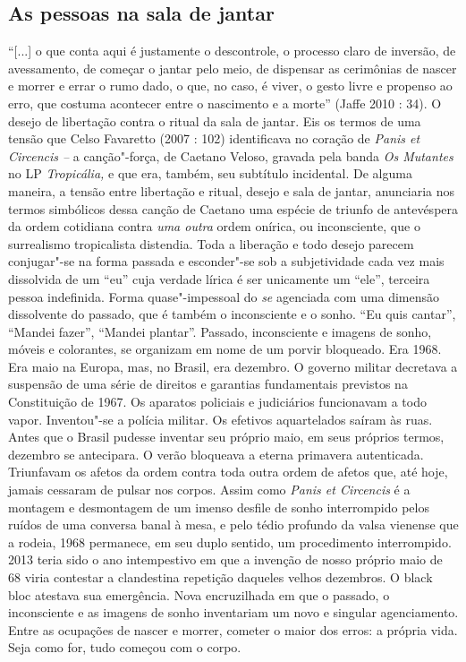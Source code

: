 \subsection{As pessoas na sala de jantar}

``{[}...{]} o que conta aqui é
justamente o descontrole, o processo claro de inversão, de avessamento,
de começar o jantar pelo meio, de dispensar as cerimônias de nascer e
morrer e errar o rumo dado, o que, no caso, é viver, o gesto livre e
propenso ao erro, que costuma acontecer entre o nascimento e a morte''
(Jaffe 2010 : 34). O desejo de libertação contra o ritual da sala de
jantar. Eis os termos de uma tensão que Celso Favaretto (2007 : 102)
identificava no coração de \emph{Panis et Circencis --} a canção"-força,
de Caetano Veloso, gravada pela banda \emph{Os Mutantes }no LP
\emph{Tropicália, }e que era, também, seu subtítulo incidental. De
alguma maneira, a tensão entre libertação e ritual, desejo e sala de
jantar, anunciaria nos termos simbólicos dessa canção de Caetano uma
espécie de triunfo de antevéspera da ordem cotidiana contra \emph{uma
outra} ordem onírica, ou inconsciente, que o surrealismo tropicalista
distendia. Toda a liberação e todo desejo parecem conjugar"-se na forma
passada e esconder"-se sob a subjetividade cada vez mais dissolvida de um
``eu'' cuja verdade lírica é ser unicamente um ``ele'', terceira pessoa
indefinida. Forma quase"-impessoal do \emph{se} agenciada com uma
dimensão dissolvente do passado, que é também o inconsciente e o sonho.
``Eu quis cantar'', ``Mandei fazer'', ``Mandei plantar''. Passado,
inconsciente e imagens de sonho, móveis e colorantes, se organizam em
nome de um porvir bloqueado. Era 1968. Era maio na Europa, mas, no
Brasil, era dezembro. O governo militar decretava a suspensão de uma
série de direitos e garantias fundamentais previstos na Constituição de
1967. Os aparatos policiais e judiciários funcionavam a todo vapor.
Inventou"-se a polícia militar. Os efetivos aquartelados saíram às ruas.
Antes que o Brasil pudesse inventar seu próprio maio, em seus próprios
termos, dezembro se antecipara. O verão bloqueava a eterna primavera
autenticada. Triunfavam os afetos da ordem contra toda outra ordem de
afetos que, até hoje, jamais cessaram de pulsar nos corpos. Assim como
\emph{Panis et Circencis} é a montagem e desmontagem de um imenso
desfile de sonho interrompido pelos ruídos de uma conversa banal à mesa,
e pelo tédio profundo da valsa vienense que a rodeia, 1968 permanece, em
seu duplo sentido, um procedimento interrompido. 2013 teria sido o ano
intempestivo em que a invenção de nosso próprio maio de 68 viria
contestar a clandestina repetição daqueles velhos dezembros. O black
bloc atestava sua emergência. Nova encruzilhada em que o passado, o
inconsciente e as imagens de sonho inventariam um novo e singular
agenciamento. Entre as ocupações de nascer e morrer, cometer o maior dos
erros: a própria vida. Seja como for, tudo começou com o corpo.

